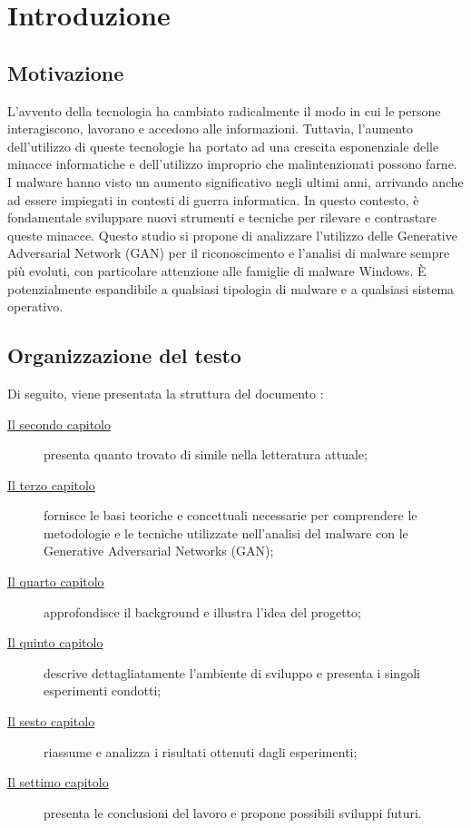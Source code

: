 \chapter{Introduzione}
\label{cap:introduzione}

\section{Motivazione}
L'avvento della tecnologia ha cambiato radicalmente il modo in cui le persone interagiscono, lavorano e accedono alle informazioni. 
Tuttavia, l'aumento dell'utilizzo di queste tecnologie ha portato ad una crescita esponenziale delle minacce informatiche e dell'utilizzo improprio che malintenzionati possono farne. I malware hanno visto un aumento significativo negli ultimi anni, arrivando anche ad essere impiegati in contesti di guerra informatica. 
In questo contesto, è fondamentale sviluppare nuovi strumenti e tecniche per rilevare e contrastare queste minacce. Questo studio si propone di analizzare l'utilizzo delle Generative Adversarial Network (GAN) per il riconoscimento e l'analisi di malware sempre più evoluti, con particolare attenzione alle famiglie di malware Windows. È potenzialmente espandibile a qualsiasi tipologia di malware e a qualsiasi sistema operativo.


\section{Organizzazione del testo}
\indent Di seguito, viene presentata la struttura del documento :
\begin{description}
    \item[{\hyperref[cap:RelatedWorks]{Il secondo capitolo}}] presenta quanto trovato di simile nella letteratura attuale;

    \item[{\hyperref[cap:background]{Il terzo capitolo}}] fornisce le basi teoriche e concettuali necessarie per comprendere le metodologie e le tecniche utilizzate nell'analisi del malware con le Generative Adversarial Networks (GAN);

    \item[{\hyperref[cap:descrizione]{Il quarto capitolo}}] approfondisce il background e illustra l'idea del progetto;
    
    \item[{\hyperref[cap:processi-metodologie]{Il quinto capitolo}}] descrive dettagliatamente l'ambiente di sviluppo e presenta i singoli esperimenti condotti;

    \item[{\hyperref[cap:risultati]{Il sesto capitolo}}] riassume e analizza i risultati ottenuti dagli esperimenti;
    
    \item[{\hyperref[cap:conclusioni]{Il settimo capitolo}}] presenta le conclusioni del lavoro e propone possibili sviluppi futuri.
\end{description}
